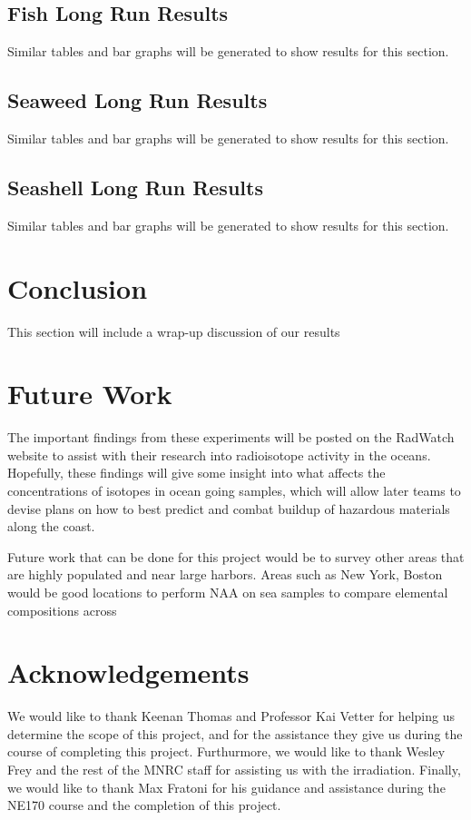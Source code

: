 \documentclass[]{article}
\begin{document}
\subsection{Fish Long Run Results}
Similar tables and bar graphs will be generated to show results for this section.
\subsection{Seaweed Long Run Results}
Similar tables and bar graphs will be generated to show results for this section.
\subsection{Seashell Long Run Results}
Similar tables and bar graphs will be generated to show results for this section.

\section{Conclusion}
This section will include a wrap-up discussion of our results


\section{Future Work}

The important findings from these experiments will be posted on the RadWatch website to assist with their research into radioisotope activity in the oceans. Hopefully, these findings will give some insight into what affects the concentrations of isotopes in ocean going samples, which will allow later teams to devise plans on how to best predict and combat buildup of hazardous materials along the coast. 

Future work that can be done for this project would be to survey other areas that are highly populated and near large harbors. Areas such as New York, Boston would be good locations to perform NAA on sea samples to compare elemental compositions across 



\section{Acknowledgements}

We would like to thank Keenan Thomas and Professor Kai Vetter for helping us determine the scope of this project, and for the assistance they give us during the course of completing this project. Furthurmore, we would like to thank Wesley Frey and the rest of the MNRC staff for assisting us with the irradiation. Finally, we would like to thank Max Fratoni for his guidance and assistance during the NE170 course and the completion of this project.
\end{document}
